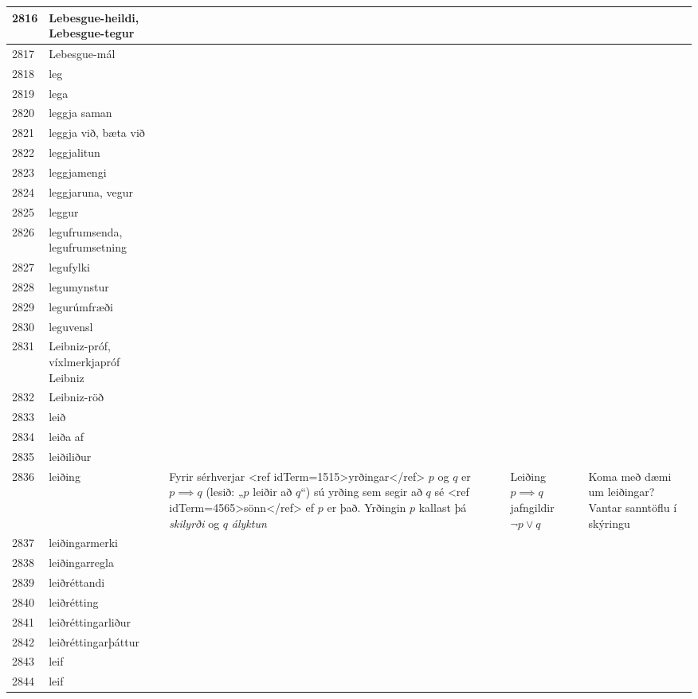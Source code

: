 \begin{longtable}{p{}|p{}|p{}|p{}|p{}}
\hline
2816 & Lebesgue-heildi, Lebesgue-tegur &  &  &  \\
\hline
2817 & Lebesgue-mál &  &  &  \\
\hline
2818 & leg &  &  &  \\
\hline
2819 & lega &  &  &  \\
\hline
2820 & leggja saman &  &  &  \\
\hline
2821 & leggja við, bæta við &  &  &  \\
\hline
2822 & leggjalitun &  &  &  \\
\hline
2823 & leggjamengi &  &  &  \\
\hline
2824 & leggjaruna, vegur &  &  &  \\
\hline
2825 & leggur &  &  &  \\
\hline
2826 & legufrumsenda, legufrumsetning &  &  &  \\
\hline
2827 & legufylki &  &  &  \\
\hline
2828 & legumynstur &  &  &  \\
\hline
2829 & legurúmfræði &  &  &  \\
\hline
2830 & leguvensl &  &  &  \\
\hline
2831 & Leibniz-próf, víxlmerkjapróf Leibniz &  &  &  \\
\hline
2832 & Leibniz-röð &  &  &  \\
\hline
2833 & leið &  &  &  \\
\hline
2834 & leiða af &  &  &  \\
\hline
2835 & leiðiliður &  &  &  \\
\hline
2836 & leiðing & Fyrir sérhverjar <ref idTerm=1515>yrðingar</ref> $p$ og $q$ er $p \implies q$ (lesið: „$p$ leiðir að $q$“) sú yrðing sem segir að $q$ sé <ref idTerm=4565>sönn</ref> ef $p$ er það. Yrðingin $p$ kallast þá \textit{skilyrði} og $q$ \textit{ályktun} & Leiðing $p \implies q$ jafngildir $\lnot p \lor q$ & Koma með dæmi um leiðingar? Vantar sanntöflu í skýringu \\
\hline
2837 & leiðingarmerki &  &  &  \\
\hline
2838 & leiðingarregla &  &  &  \\
\hline
2839 & leiðréttandi &  &  &  \\
\hline
2840 & leiðrétting &  &  &  \\
\hline
2841 & leiðréttingarliður &  &  &  \\
\hline
2842 & leiðréttingarþáttur &  &  &  \\
\hline
2843 & leif &  &  &  \\
\hline
2844 & leif &  &  &  \\

\end{longtable}
